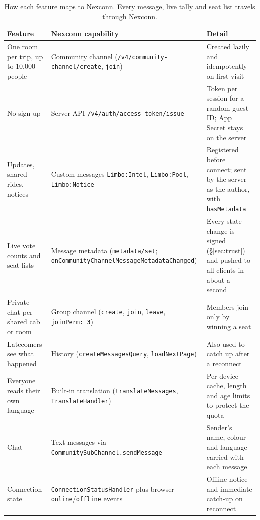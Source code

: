 \documentclass[10pt,twocolumn]{article}
\newcommand{\code}[1]{\texttt{\small #1}}
\begin{document}
\begin{table}[t]
\centering\small
\caption{How each feature maps to Nexconn. Every message, live tally and seat list travels through Nexconn.}
\label{tab:nexconn}
\begin{tabularx}{\textwidth}{@{}>{\raggedright\arraybackslash}p{4.1cm} >{\raggedright\arraybackslash}p{5.6cm} X@{}}
\toprule
\textbf{Feature} & \textbf{Nexconn capability} & \textbf{Detail} \\
\midrule
One room per trip, up to 10{,}000 people & Community channel (\code{/v4/community-channel/create}, \code{join}) & Created lazily and idempotently on first visit \\
No sign-up & Server API \code{/v4/auth/access-token/issue} & Token per session for a random guest ID; App Secret stays on the server \\
Updates, shared rides, notices & Custom messages \code{Limbo:Intel}, \code{Limbo:Pool}, \code{Limbo:Notice} & Registered before connect; sent by the server as the author, with \code{hasMetadata} \\
Live vote counts and seat lists & Message metadata (\code{metadata/set}; \code{onCommunityChannelMessageMetadataChanged}) & Every state change is signed (\S\ref{sec:trust}) and pushed to all clients in about a second \\
Private chat per shared cab or room & Group channel (\code{create}, \code{join}, \code{leave}, \code{joinPerm: 3}) & Members join only by winning a seat \\
Latecomers see what happened & History (\code{createMessagesQuery}, \code{loadNextPage}) & Also used to catch up after a reconnect \\
Everyone reads their own language & Built-in translation (\code{translateMessages}, \code{TranslateHandler}) & Per-device cache, length and age limits to protect the quota \\
Chat & Text messages via \code{CommunitySubChannel.sendMessage} & Sender's name, colour and language carried with each message \\
Connection state & \code{ConnectionStatusHandler} plus browser \code{online}/\code{offline} events & Offline notice and immediate catch-up on reconnect \\
\bottomrule
\end{tabularx}
\end{table}

\end{document}
